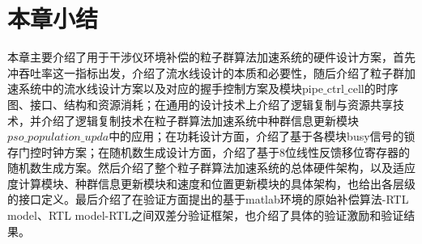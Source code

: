 \section{本章小结}
本章主要介绍了用于干涉仪环境补偿的粒子群算法加速系统的硬件设计方案，首先冲吞吐率这一指标出发，介绍了流水线设计的本质和必要性，随后介绍了粒子群加速系统中的流水线设计方案以及对应的握手控制方案及模块pipe$\_$ctrl$\_$cell的时序图、接口、结构和资源消耗；在通用的设计技术上介绍了逻辑复制与资源共享技术，并介绍了逻辑复制技术在粒子群算法加速系统中种群信息更新模块$pso\_population\_upda$中的应用；在功耗设计方面，介绍了基于各模块busy信号的锁存门控时钟方案；在随机数生成设计方面，介绍了基于8位线性反馈移位寄存器的随机数生成方案。然后介绍了整个粒子群算法加速系统的总体硬件架构，以及适应度计算模块、种群信息更新模块和速度和位置更新模块的具体架构，也给出各层级的接口定义。最后介绍了在验证方面提出的基于matlab环境的原始补偿算法-RTL model、RTL model-RTL之间双差分验证框架，也介绍了具体的验证激励和验证结果。
